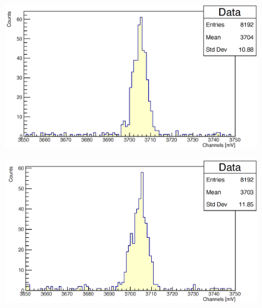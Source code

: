 \documentclass[a4paper,10pt]{article}
\begin{document}
\begin{figure}[H]
    \centering
    \includegraphics[scale=0.45]{appendice/spettri/NaA_1460_16}
\end{figure}
\begin{figure}[H]
    \centering
    \includegraphics[scale=0.45]{appendice/spettri/NaA_1460_20}
\end{figure}
\end{document}
